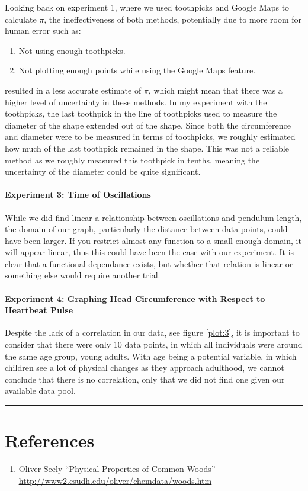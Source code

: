 \documentclass{article}
\begin{document}
Looking back on experiment 1, where we used toothpicks and Google Maps to calculate $\pi$,
the ineffectiveness of both methods, potentially due to more room for human error such as:
\begin{enumerate}
    \item Not using enough toothpicks.
    \item Not plotting enough points while using the Google Maps feature.
\end{enumerate}
resulted in a less accurate estimate of $\pi$, which might mean that there was a higher 
level of uncertainty in these methods. In my experiment with the toothpicks, the last 
toothpick in the line of toothpicks used to measure the diameter of the shape extended out 
of the shape. Since both the circumference and diameter were to be measured in terms of 
toothpicks, we roughly estimated how much of the last toothpick remained in the shape. 
This was not a reliable method as we roughly measured this toothpick in tenths, meaning 
the uncertainty of the diameter could be quite significant. 

\paragraph{Experiment 3: Time of Oscillations} While we did find linear a relationship between 
oscillations and pendulum length, the domain of our graph, particularly the distance 
between data points, could have been larger. If you restrict almost any function to a 
small enough domain, it will appear linear, thus this could have been the case with our 
experiment. It is clear that a functional dependance exists, but whether that relation is
linear or something else would require another trial.

\paragraph{Experiment 4: Graphing Head Circumference with Respect to Heartbeat Pulse} Despite 
the lack of a correlation in our data, see figure \ref{plot:3}, it is important to consider 
that there were only 10 data points, in which all individuals were around the same age 
group, young adults. With age being a potential variable, in which children see a lot 
of physical changes as they approach adulthood, we cannot conclude that there is no 
correlation, only that we did not find one given our available data pool.

\vspace{1em}
\hrule
\vspace{1em}
\section{References}
\begin{enumerate}[label=(\arabic*)]
    \item Oliver Seely ``Physical Properties of Common Woods'' 
    \underline{\url{http://www2.csudh.edu/oliver/chemdata/woods.htm}}
\end{enumerate}
\end{document}
